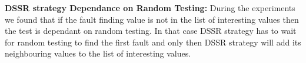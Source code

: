 \textbf{DSSR strategy Dependance on Random Testing:}
During the experiments we found that if the fault finding value is not in the list of interesting values then the test is dependant on random testing. In that case DSSR strategy has to wait for random testing to find the first fault and only then DSSR strategy will add its neighbouring values to the list of interesting values.
